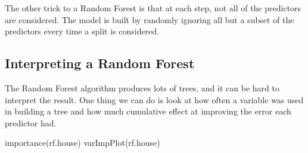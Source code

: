 \documentclass[
]{article}
\newenvironment{Shaded}{\begin{snugshade}}{\end{snugshade}}
\newcommand{\AttributeTok}[1]{\textcolor[rgb]{0.77,0.63,0.00}{#1}}
\newcommand{\ConstantTok}[1]{\textcolor[rgb]{0.00,0.00,0.00}{#1}}
\newcommand{\FunctionTok}[1]{\textcolor[rgb]{0.00,0.00,0.00}{#1}}
\newcommand{\NormalTok}[1]{#1}
\newcommand{\OtherTok}[1]{\textcolor[rgb]{0.56,0.35,0.01}{#1}}
\newcommand{\SpecialCharTok}[1]{\textcolor[rgb]{0.00,0.00,0.00}{#1}}
\begin{document}
The other trick to a Random Forest is that at each step, not all of the
predictors are considered. The model is built by randomly ignoring all
but a subset of the predictors every time a split is considered.

\begin{Shaded}
\end{Shaded}

\hypertarget{interpreting-a-random-forest}{%
\subsection{Interpreting a Random
Forest}\label{interpreting-a-random-forest}}

The Random Forest algorithm produces lots of trees, and it can be hard
to interpret the result. One thing we can do is look at how often a
variable was used in building a tree and how much cumulative effect at
improving the error each predictor had.

\begin{Shaded}
\begin{Highlighting}[]
\FunctionTok{importance}\NormalTok{(rf.house)}
\FunctionTok{varImpPlot}\NormalTok{(rf.house)}
\end{Highlighting}
\end{Shaded}
\end{document}
